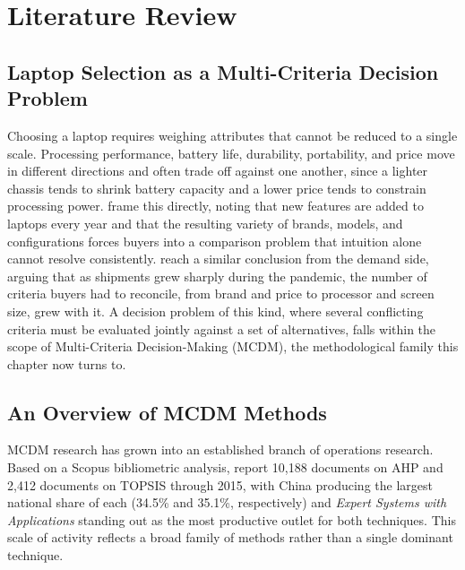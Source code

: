 \chapter{Literature Review}\label{ch:literature}

\section{Laptop Selection as a Multi-Criteria Decision Problem}\label{sec:mcdm-problem}

Choosing a laptop requires weighing attributes that cannot be reduced to a single scale.
Processing performance, battery life, durability, portability, and price move in different
directions and often trade off against one another, since a lighter chassis tends to shrink
battery capacity and a lower price tends to constrain processing power. \textcite{sonmez_cakir_determination_2020}
frame this directly, noting that new features are added to laptops every year and that the
resulting variety of brands, models, and configurations forces buyers into a comparison problem
that intuition alone cannot resolve consistently. \textcite{gaur_application_2023} reach a similar
conclusion from the demand side, arguing that as shipments grew sharply during the pandemic, the
number of criteria buyers had to reconcile, from brand and price to processor and screen size, grew with it.
A decision problem of this kind, where several conflicting criteria must be evaluated jointly
against a set of alternatives, falls within the scope of Multi-Criteria Decision-Making (MCDM),
the methodological family this chapter now turns to.

\section{An Overview of MCDM Methods}\label{sec:mcdm-overview}

MCDM research has grown into an established branch of operations research. Based on a Scopus
bibliometric analysis, \textcite{zyoud_bibliometric-based_2017} report 10{,}188 documents on AHP
and 2{,}412 documents on TOPSIS through 2015, with China producing the largest national share of
each (34.5\% and 35.1\%, respectively) and \emph{Expert Systems with Applications} standing out as
the most productive outlet for both techniques. This scale of activity reflects a broad family of
methods rather than a single dominant technique.

